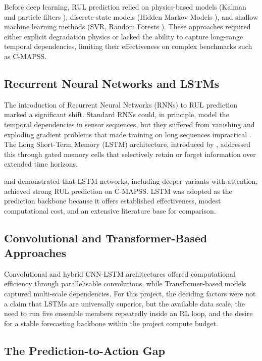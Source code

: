 \documentclass[12pt,a4paper]{report}
\begin{document}
Before deep learning, RUL prediction relied on physics-based models (Kalman and particle filters \citep{si2011remaining}), discrete-state models (Hidden Markov Models \citep{baruah2005hmms}), and shallow machine learning methods (SVR, Random Forests \citep{louen2013svm}). These approaches required either explicit degradation physics or lacked the ability to capture long-range temporal dependencies, limiting their effectiveness on complex benchmarks such as C-MAPSS.

\subsection{Recurrent Neural Networks and LSTMs}

The introduction of Recurrent Neural Networks (RNNs) to RUL prediction marked a significant shift. Standard RNNs could, in principle, model the temporal dependencies in sensor sequences, but they suffered from vanishing and exploding gradient problems that made training on long sequences impractical \citep{bengio1994learning}. The Long Short-Term Memory (LSTM) architecture, introduced by \citet{hochreiter1997long}, addressed this through gated memory cells that selectively retain or forget information over extended time horizons.


\citet{zheng2017long} and \citet{wu2018remaining} demonstrated that LSTM networks, including deeper variants with attention, achieved strong RUL prediction on C-MAPSS. LSTM was adopted as the prediction backbone because it offers established effectiveness, modest computational cost, and an extensive literature base for comparison.

\subsection{Convolutional and Transformer-Based Approaches}

Convolutional and hybrid CNN-LSTM architectures \citep{li2018remaining, sateesh2016deep} offered computational efficiency through parallelisable convolutions, while Transformer-based models \citep{mo2021multi, zhang2022transformer} captured multi-scale dependencies. For this project, the deciding factors were not a claim that LSTMs are universally superior, but the available data scale, the need to run five ensemble members repeatedly inside an RL loop, and the desire for a stable forecasting backbone within the project compute budget.

\subsection{The Prediction-to-Action Gap}
\end{document}
